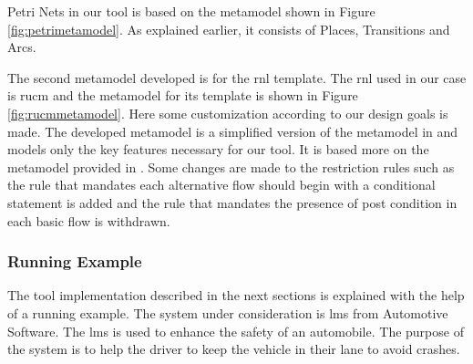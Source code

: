 Petri Nets in our tool is based on the metamodel shown in Figure \ref{fig:petrimetamodel}. As explained earlier, it consists of Places, Transitions and Arcs. 

The second metamodel developed is for the \gls{rnl} template. The \gls{rnl} used in our case is \gls{rucm} and the metamodel for its template is shown in Figure \ref{fig:rucmmetamodel}. Here some customization according to our design goals is made. The developed metamodel is a simplified version of the metamodel in \cite{yue2013facilitating} and models only the key features necessary for our tool. It is based more on the metamodel provided in \cite{calisaya2016analysis}. Some changes are made to the restriction rules such as the rule that mandates each alternative flow should begin with a conditional statement is added and the rule that mandates the presence of post condition in each basic flow is withdrawn. 

\subsubsection{Running Example}
The tool implementation described in the next sections is explained with the help of a running example. The system under consideration is \gls{lms} from Automotive Software. The \gls{lms} is used to enhance the safety of an automobile. The purpose of the system is to help the driver to keep the vehicle in their lane to avoid crashes. 

